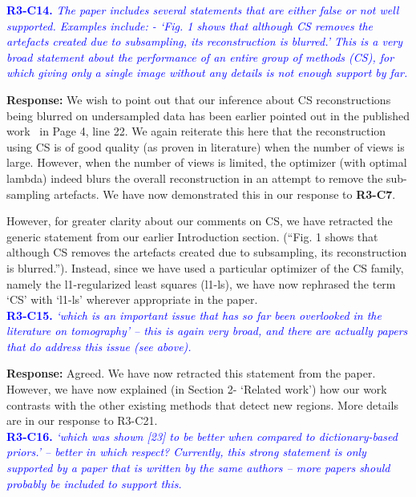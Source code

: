 \documentclass{article}
\begin{document}
\textcolor{blue}{\textbf{R3-C14.}\textit{ The paper includes several statements that are either false or not well supported. Examples include:    - `Fig. 1 shows that although CS removes the artefacts created due to subsampling, its reconstruction is blurred.' This is a very broad statement about the performance of an entire group of methods (CS), for which giving only a single image without any details is not enough support by far.}}

\textbf{Response:} We wish to point out that our inference about CS reconstructions being blurred on undersampled data has been earlier pointed out in the published work~\cite{PICCS} in Page 4, line 22.  We again reiterate this here that the reconstruction using CS is of good quality (as proven in literature) when the number of views is large. However, when the number of views is limited, the optimizer (with optimal lambda) indeed blurs the overall reconstruction in an attempt to remove the sub-sampling artefacts. We have now demonstrated this in our response to \textbf{R3-C7}.

However, for greater clarity about our comments on CS, we have retracted the generic statement from our earlier Introduction section. (``Fig. 1 shows that although CS removes the artefacts created due to subsampling, its reconstruction is blurred.''). Instead, since we have used a particular optimizer of the CS family, namely the l1-regularized least squares (l1-ls), we have now rephrased the term `CS'  with `l1-ls' wherever appropriate in the paper.\\


\textcolor{blue}{\textbf{R3-C15.}\textit{ `which is an important issue that has so far been overlooked in the literature on tomography' -- this is again very broad, and there are actually papers that do address this issue (see above).}}

\textbf{Response:} Agreed. We have now retracted this statement from the paper. However, we have now explained (in Section 2- `Related work') how our work contrasts with the other existing methods that detect new regions. More details are in our response to R3-C21.\\
 
\textcolor{blue}{\textbf{R3-C16.}\textit{ `which was shown [23] to be better when compared to dictionary-based priors.' -- better in which respect? Currently, this strong statement is only supported by a paper that is written by the same authors -- more papers should probably be included to support this.}}
\end{document}
